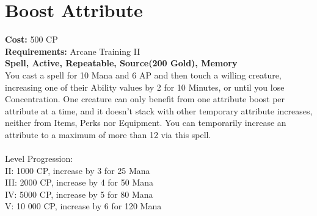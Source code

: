 \section{Boost Attribute}
\textbf{Cost:} 500 CP\\
\textbf{Requirements:} Arcane Training II\\
\textbf{Spell, Active, Repeatable, Source(200 Gold), Memory}\\
You cast a spell for 10 Mana and 6 AP and then touch a willing creature, increasing one of their Ability values by 2 for 10 Minutes, or until you lose Concentration. One creature can only benefit from one attribute boost per attribute at a time, and it doesn’t stack with other temporary attribute increases, neither from Items, Perks nor Equipment. You can temporarily increase an attribute to a maximum of more than 12 via this spell.\\
\\
Level Progression:\\
II: 1000 CP, increase by 3 for 25 Mana\\
III: 2000 CP, increase by 4 for 50 Mana\\
IV: 5000 CP, increase by 5 for 80 Mana\\
V: 10 000 CP, increase by 6 for 120 Mana\\